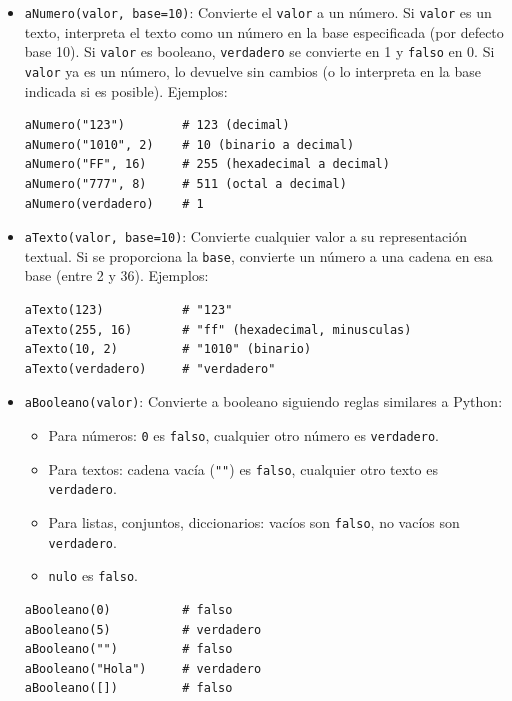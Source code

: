 \documentclass[12pt]{article}
\begin{document}
\begin{itemize}
    \item \texttt{aNumero(valor, base=10)}: Convierte el \texttt{valor} a un número. Si \texttt{valor} es un texto, interpreta el texto como un número en la base especificada (por defecto base 10). Si \texttt{valor} es booleano, \texttt{verdadero} se convierte en 1 y \texttt{falso} en 0. Si \texttt{valor} ya es un número, lo devuelve sin cambios (o lo interpreta en la base indicada si es posible). Ejemplos:
    \begin{lstlisting}
aNumero("123")        # 123 (decimal)
aNumero("1010", 2)    # 10 (binario a decimal)
aNumero("FF", 16)     # 255 (hexadecimal a decimal)
aNumero("777", 8)     # 511 (octal a decimal)
aNumero(verdadero)    # 1
    \end{lstlisting}

    \item \texttt{aTexto(valor, base=10)}: Convierte cualquier valor a su representación textual. Si se proporciona la \texttt{base}, convierte un número a una cadena en esa base (entre 2 y 36). Ejemplos:
    \begin{lstlisting}
aTexto(123)           # "123"
aTexto(255, 16)       # "ff" (hexadecimal, minusculas)
aTexto(10, 2)         # "1010" (binario)
aTexto(verdadero)     # "verdadero"
    \end{lstlisting}

    \item \texttt{aBooleano(valor)}: Convierte a booleano siguiendo reglas similares a Python:
    \begin{itemize}
        \item Para números: \texttt{0} es \texttt{falso}, cualquier otro número es \texttt{verdadero}.
        \item Para textos: cadena vacía (\texttt{""}) es \texttt{falso}, cualquier otro texto es \texttt{verdadero}.
        \item Para listas, conjuntos, diccionarios: vacíos son \texttt{falso}, no vacíos son \texttt{verdadero}.
        \item \texttt{nulo} es \texttt{falso}.
    \end{itemize}
    \begin{lstlisting}
aBooleano(0)          # falso
aBooleano(5)          # verdadero
aBooleano("")         # falso
aBooleano("Hola")     # verdadero
aBooleano([])         # falso
    \end{lstlisting}
\end{itemize}
\end{document}
